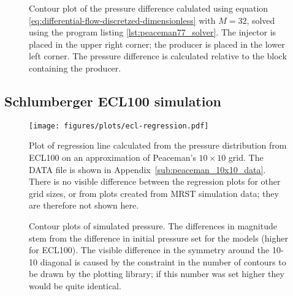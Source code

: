 \begin{figure}[htbp]
    \centering
    \scalebox{0.7}{}
    \caption{Contour plot of the pressure difference calulated using equation \eqref{eq:differential-flow-discretzed-dimensionless} with $M=32$, solved using the program listing \ref{lst:peaceman77_solver}. The injector is placed in the upper right corner; the producer is placed in the lower left corner. The pressure difference is calculated relative to the block containing the producer.}
    \label{fig:pressure_drop_contour}
\end{figure}






\subsection{Schlumberger ECL100 simulation} %
\label{sub:schlumberger_ecl100_simulation_results}



\begin{figure}[htbp]
    \centering
    \texttt{[image: figures/plots/ecl-regression.pdf]}
    \caption{Plot of regression line calculated from the pressure distribution from ECL100 on an approximation of Peaceman's $10\times 10$ grid. The DATA file is shown in Appendix~\ref{sub:peaceman_10x10_data}. There is no visible difference between the regression plots for other grid sizes, or from plots created from MRST simulation data; they are therefore not shown here.}
    \label{fig:regression-ecl10}
\end{figure}

\begin{figure}
    \begin{minipage}[b]{.5\linewidth}
        \centering\scalebox{.53}{}
        \label{fig:contour-ecl10}
    \end{minipage}%
    \begin{minipage}[b]{.5\linewidth}
        \centering\scalebox{.53}{}
        \label{fig:contour-mrst10}
    \end{minipage}
    \caption{Contour plots of simulated pressure. The differences in magnitude stem from the difference in initial pressure set for the models (higher for ECL100). The visible difference in the symmetry around the 10-10 diagonal is caused by the constraint in the number of contours to be drawn by the plotting library; if this number was set higher they would be quite identical.}
    \label{fig:contours-ect10-mrst10}
\end{figure}


